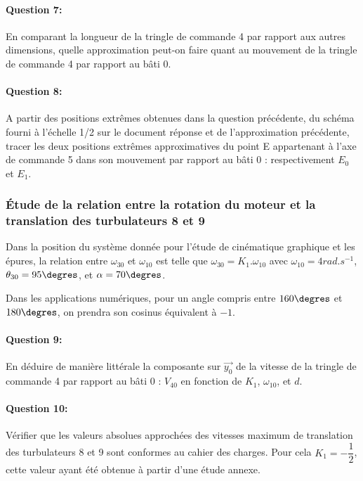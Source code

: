 \paragraph{Question 7:} En comparant la longueur de la tringle de commande 4 par rapport aux autres dimensions, quelle approximation peut-on faire quant au mouvement de la tringle de commande 4 par rapport au bâti 0.

\paragraph{Question 8:} A partir des positions extrêmes obtenues dans la question précédente, du schéma fourni à l'échelle 1/2 sur le document réponse et de l'approximation précédente, tracer les deux positions extrêmes approximatives du point E appartenant à l'axe de commande 5 dans son mouvement par rapport au bâti 0 : respectivement $E_0$ et $E_1$.

\subsubsection{Étude de la relation entre la rotation du moteur et la translation des turbulateurs 8 et 9}

Dans la position du système donnée pour l'étude de cinématique graphique et les épures, la relation entre $\omega_{30}$ et $\omega_{10}$ est telle que $\omega_{30}=K_1.\omega_{10}$ avec $\omega_{10}=4rad.s^{-1}$, $\theta_{30}=95\degres$, et $\alpha=70\degres$.

Dans les applications numériques, pour un angle compris entre $160\degres$ et $180\degres$, on prendra son cosinus équivalent à $-1$.

\paragraph{Question 9:} En déduire de manière littérale la composante sur $\overrightarrow{y_0}$ de la vitesse de la tringle de commande 4 par rapport au bâti 0 : $V_{40}$ en fonction de $K_1$, $\omega_{10}$, et $d$.

\paragraph{Question 10:} Vérifier que les valeurs absolues approchées des vitesses maximum de translation des turbulateurs 8 et 9 sont conformes au cahier des charges. Pour cela $K_1=-\dfrac{1}{2}$, cette valeur ayant été obtenue à partir d'une étude annexe.

